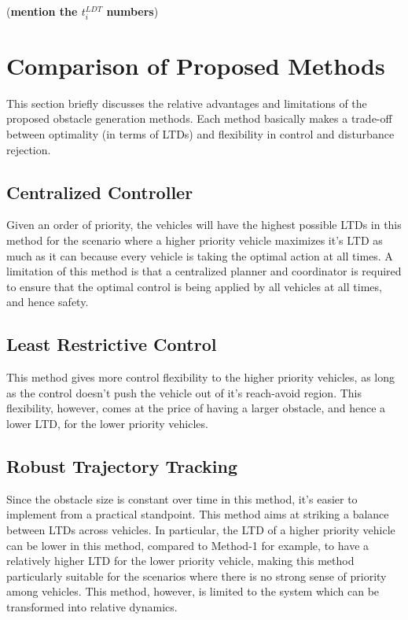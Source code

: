 %
(\textbf{mention the $t_i^{LDT}$ numbers})

\section{Comparison of Proposed Methods}
This section briefly discusses the relative advantages and limitations of the proposed obstacle generation methods. Each method basically makes a trade-off between optimality (in terms of LTDs) and flexibility in control and disturbance rejection.

\subsection{Centralized Controller}
Given an order of priority, the vehicles will have the highest possible LTDs in this method for the scenario where a higher priority vehicle maximizes it's LTD as much as it can because every vehicle is taking the optimal action at all times. 
A limitation of this method is that a centralized planner and coordinator is required to ensure that the optimal control is being applied by all vehicles at all times, and hence safety.

\subsection{Least Restrictive Control}
This method gives more control flexibility to the higher priority vehicles, as long as the control doesn't push the vehicle out of it's reach-avoid region. This flexibility, however, comes at the price of having a larger obstacle, and hence a lower LTD, for the lower priority vehicles.  

\subsection{Robust Trajectory Tracking}
Since the obstacle size is constant over time in this method, it's easier to implement from a practical standpoint. This method aims at striking a balance between LTDs across vehicles. In particular, the LTD of a higher priority vehicle can be lower in this method, compared to Method-1 for example, to have a relatively higher LTD for the lower priority vehicle, making this method particularly suitable for the scenarios where there is no strong sense of priority among vehicles. This method, however, is limited to the system which can be transformed into relative dynamics.